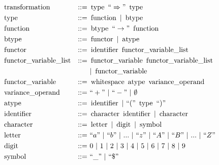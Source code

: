 \documentclass[../../Dissertation.tex]{subfiles}
\begin{document}
\begin{align*}
  &\transformterminal &::=&\ \typeterminal\ ``\Rightarrow"\ \typeterminal\\
  &\typeterminal &::=&\ \functionterminal\ |\ \btypeterminal\\
  &\functionterminal &::=&\ \btypeterminal\ ``\rightarrow"\ \functionterminal\\
  &\btypeterminal &::=&\ \functorterminal\ |\ \atypeterminal\\
  &\functorterminal &::=&\ \identifierterminal\ \variablelistterminal\\
  &\variablelistterminal &::=&\ \variableterminal\ \variablelistterminal\\ 
  &&&\ |\ \variableterminal\\
  &\variableterminal &::=&\ \whitespaceterminal\ \atypeterminal\ \varianceterminal\\
  &\varianceterminal &::=&\ ``+"\ |\ ``-"\ |\ \emptyset\\
  &\atypeterminal &::=&\ \identifierterminal\ |\ ``("\ \typeterminal\ ``)"\\
  &\identifierterminal &::=&\ \characterterminal\ \identifierterminal\ |\ \characterterminal\\
  &\characterterminal &::=&\ \letterterminal\ |\ \digitterminal\ |\ \symbolterminal\\
  &\letterterminal &::=&\ ``a"\ |\ ``b"\ |\ ...\ |\ ``z"\ |\ ``A"\ |\ ``B"\ |\ ...\ |\ ``Z"\\
  &\digitterminal &::=&\ 0\ |\ 1\ |\ 2\ |\ 3\ |\ 4\ |\ 5\ |\ 6\ |\ 7\ |\ 8\ |\ 9\\
  &\symbolterminal &::=&\ ``\_"\ |\ ``\$"
\end{align*}
\end{document}
